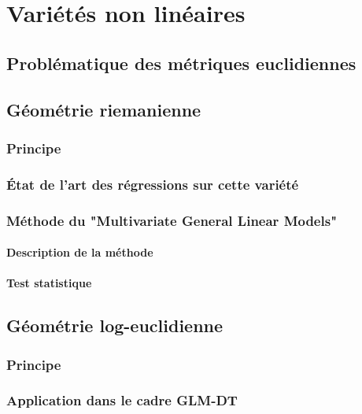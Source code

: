 
\chapter{Variétés non linéaires}
\label{Chapter5}



\section{Problématique des métriques euclidiennes}
\section{Géométrie riemanienne}
\subsection{Principe}
\subsection{État de l'art des régressions sur cette variété}
\subsection{Méthode du "Multivariate General Linear Models"}
\subsubsection{Description de la méthode}
\subsubsection{Test statistique}

\section{Géométrie log-euclidienne}
\subsection{Principe}
\subsection{Application dans le cadre GLM-DT}



